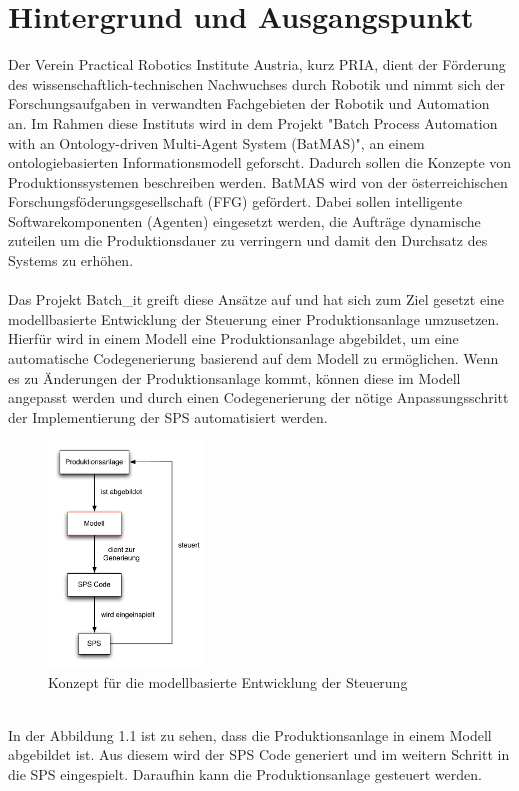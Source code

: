 \section{Hintergrund und Ausgangspunkt}
Der Verein Practical Robotics Institute Austria, kurz PRIA, dient der Förderung des wissenschaftlich-technischen Nachwuchses durch Robotik und nimmt sich der Forschungsaufgaben in verwandten Fachgebieten der Robotik und Automation an.
Im Rahmen diese Instituts wird in dem Projekt "Batch Process Automation with an On\-to\-lo\-gy-driven Multi-Agent System (BatMAS)", an einem ontologiebasierten Informationsmodell geforscht. Dadurch sollen die Konzepte von Produktionssystemen  beschreiben werden. BatMAS wird von  der österreichischen Forschungsföderungsgesellschaft (FFG) gefördert. Dabei sollen intelligente Softwarekomponenten (Agenten) eingesetzt werden, die Aufträge dynamische zuteilen um die Produktionsdauer zu verringern und damit den Durchsatz des Systems zu erhöhen.\\\\
Das Projekt Batch\_it greift diese Ansätze auf und hat sich zum Ziel gesetzt eine modellbasierte Entwicklung der Steuerung einer Produktionsanlage umzusetzen. Hierfür wird in einem Modell eine Produktionsanlage abgebildet, um eine automatische Codegenerierung basierend auf dem Modell zu ermöglichen. Wenn es zu Änderungen der Produktionsanlage kommt, können diese im Modell angepasst werden und durch einen Codegenerierung der nötige Anpassungsschritt der Implementierung der SPS automatisiert werden.
\begin{figure}[h!]
		\centering
		\includegraphics[width=0.37\textwidth]{graphics/ontology/konzept.pdf}
		\caption{Konzept für die modellbasierte Entwicklung der Steuerung}
\end{figure} \\
In der Abbildung 1.1 ist zu sehen, dass die Produktionsanlage in einem Modell abgebildet ist. Aus diesem wird der SPS Code generiert und im weitern Schritt in die SPS eingespielt. Daraufhin kann die Produktionsanlage gesteuert werden. 

